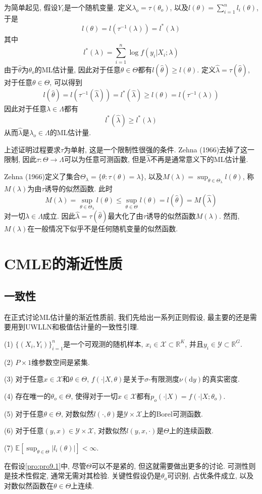 \documentclass[cn, 12pt, math=mtpro2, bibstyle=apa, blue, twocol]{elegantbook}
\newcommand{\R}{\mathbb{R}}
\newcommand{\E}{\mathbb{E}}
\newcommand{\hth}{\hat{\theta}}
\begin{document}
为简单起见, 假设$Y_i$是一个随机变量. 定义$\lambda_o=\tau(\theta_o)$, 以及$l(\theta)=\sum_{i=1}^{n}l_i(\theta)$, 于是
$$l(\theta)=l(\tau^{-1}(\lambda))=l^\ast(\lambda)$$
其中
$$l^\ast(\lambda)=\sum_{i=1}^{n} \log f(y_i|X_i;\lambda)$$
由于$\hth$为$\theta_o$的ML估计量, 因此对于任意$\theta\in\Theta$都有$l(\hth)\geq l(\theta)$. 定义$\hat{\lambda}=\tau(\hth)$, 对于任意$\theta\in\Theta$, 可以得到
\begin{align*}
l(\hth)=l(\tau^{-1}(\hat{\lambda}))=l^\ast(\hat{\lambda})\geq l(\theta)=l(\tau^{-1}(\lambda))
\end{align*}
因此对于任意$\lambda\in\Lambda$都有
$$l^\ast(\hat{\lambda})\geq l^\ast(\lambda)$$
从而$\hat{\lambda}$是$\lambda_o\in\Lambda$的ML估计量.

\begin{remark}
上述证明过程要求$\tau$为单射, 这是一个限制性很强的条件. Zehna (1966)去掉了这一限制, 因此$\tau:\Theta\to\Lambda$可以为任意可测函数, 但是$\hat{\lambda}$不再是通常意义下的ML估计量.

Zehna (1966)定义了集合$\Theta_\lambda=\{\theta: \tau(\theta)=\lambda\}$, 以及$M(\lambda)=\sup_{\theta\in\Theta_\lambda}l(\theta)$, 称$M(\lambda)$为由$\tau$诱导的似然函数. 此时
$$M(\lambda)=\sup_{\theta\in\Theta_\lambda}l(\theta)\leq\sup_{\theta\in\Theta}l(\theta)=l(\hth)=M(\hat{\lambda})$$
对一切$\lambda\in\Lambda$成立. 因此$\hat{\lambda}=\tau(\hth)$最大化了由$\tau$诱导的似然函数$M(
\lambda)$. 然而, $M(\lambda)$在一般情况下似乎不是任何随机变量的似然函数.
\end{remark}
\section{CMLE的渐近性质}
\subsection{一致性}
在正式讨论ML估计量的渐近性质前, 我们先给出一系列正则假设, 最主要的还是需要用到UWLLN和极值估计量的一致性引理.
\begin{proposition}\label{pro:pro9.1}
 (1) $\{(X_i,Y_i)\}_{i=1}^n$是一个可观测的随机样本, $x_i\in\mathscr{X}\subset\R^K$, 并且$y_i\in\mathscr{Y}\subset\R^G$.

 (2) $P\times 1$维参数空间是紧集.

 (3) 对于任意$x\in\mathscr{X}$和$\theta\in\Theta$, $f(\cdot|X,\theta)$是关于$\sigma$-有限测度$\nu(\text{d}y)$的真实密度.

 (4) 存在唯一的$\theta_o\in\Theta$, 使得对于一切$x\in\mathscr{X}$都有$p_o(\cdot|X)=f(\cdot|X;\theta_o)$.

 (5) 对于任意$\theta\in\Theta$, 对数似然$l(\cdot,\theta)$是$\mathscr{Y}\times \mathscr{X}$上的Borel可测函数.

 (6) 对于任意$(y,x)\in\mathscr{Y}\times\mathscr{X}$, 对数似然$l(y,x,\cdot)$是$\Theta$上的连续函数.

 (7) $\E[\sup_{\theta\in\Theta}| l_i(\theta)|]<\infty$.

\end{proposition}
在假设\ref{pro:pro9.1}中, 尽管$\Theta$可以不是紧的, 但这就需要做出更多的讨论. 可测性则是技术性假定, 通常无需对其检验. 关键性假设仍是$\theta_o$可识别, 占优条件成立, 以及对数似然函数在$\theta\in\Theta$上连续.
\end{document}
